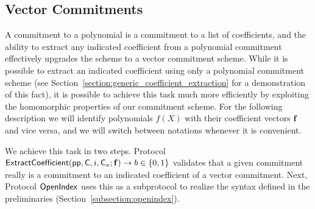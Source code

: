 \subsection{Vector Commitments}

A commitment to a polynomial is a commitment to a list of coefficients, and the ability to extract any indicated coefficient from a polynomial commitment effectively upgrades the scheme to a vector commitment scheme. While it is possible to extract an indicated coefficient using only a polynomial commitment scheme (see Section~\ref{section:generic_coefficient_extraction} for a demonstration of this fact), it is possible to achieve this task much more efficiently by exploiting the homomorphic properties of our commitment scheme. For the following description we will identify polynomials $f(X)$ with their coefficient vectors $\mathbf{f}$ and vice versa, and we will switch between notations whenever it is convenient.

We achieve this task in two steps. Protocol $\textsf{{ExtractCoefficient}}(\textsf{pp}, \mathsf{C}, i, \mathsf{C}_a; \mathbf{f}) \rightarrow b \in \{0,1\}$ validates that a given commitment really is a commitment to an indicated coefficient of a vector commitment. Next, Protocol $\textsf{{OpenIndex}}$ uses this as a subprotocol to realize the syntax defined in the preliminaries (Section~\ref{subsection:openindex}). 

